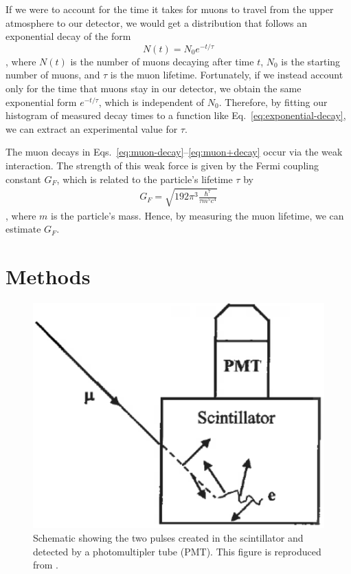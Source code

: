 \documentclass{../paper}
\begin{document}
If we were to account for the time it takes for muons to travel from the upper atmosphere to our detector, we would get a distribution that follows an exponential decay of the form
\begin{equation}\label{eq:exponential-decay}
  N(t) = N_0 e^{-t/\tau}
\end{equation}
\cite{TeachSpinManual}, where $N(t)$ is the number of muons decaying after time $t$, $N_0$ is the starting number of muons, and $\tau$ is the muon lifetime. Fortunately, if we instead account only for the time that muons stay in our detector, we obtain the same exponential form $e^{-t/\tau}$, which is independent of $N_0$. Therefore, by fitting our histogram of measured decay times to a function like Eq.~\eqref{eq:exponential-decay}, we can extract an experimental value for $\tau$.

The muon decays in Eqs.~\eqref{eq:muon-decay}--\eqref{eq:muon+decay} occur via the weak interaction. The strength of this weak force is given by the Fermi coupling constant $G_F$, which is related to the particle's lifetime $\tau$ by
\begin{align}\label{eq:Fermi-constant}
  G_F = \sqrt{192 \pi^3 \frac{\hbar^7}{\tau m^5 c^4}}
\end{align}
\cite{TeachSpinManual}, where $m$ is the particle's mass. Hence, by measuring the muon lifetime, we can estimate $G_F$.

\section{Methods} \label{sec:methods}

\begin{figure}
  \centering
  \includegraphics[width=0.6\columnwidth]{assets/detector.png}
  \caption{Schematic showing the two pulses created in the scintillator and detected by a photomultipler tube (PMT). This figure is reproduced from \cite{TeachSpinManual}.}
  \label{fig:detector}
\end{figure}
\end{document}
